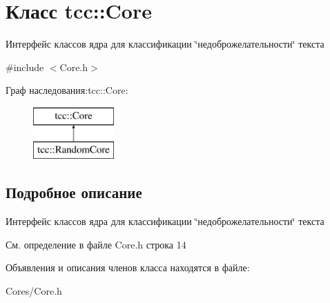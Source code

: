 \hypertarget{classtcc_1_1_core}{}\section{Класс tcc\+:\+:Core}
\label{classtcc_1_1_core}


Интерфейс классов ядра для классификации \char`\"{}недоброжелательности\char`\"{} текста  




{\ttfamily \#include $<$Core.\+h$>$}

Граф наследования\+:tcc\+:\+:Core\+:\begin{figure}[H]
\begin{center}
\leavevmode
\includegraphics[height=2.000000cm]{classtcc_1_1_core}
\end{center}
\end{figure}


\subsection{Подробное описание}
Интерфейс классов ядра для классификации \char`\"{}недоброжелательности\char`\"{} текста 

См. определение в файле Core.\+h строка 14



Объявления и описания членов класса находятся в файле\+:\begin{DoxyCompactItemize}
\item 
Cores/Core.\+h\end{DoxyCompactItemize}
